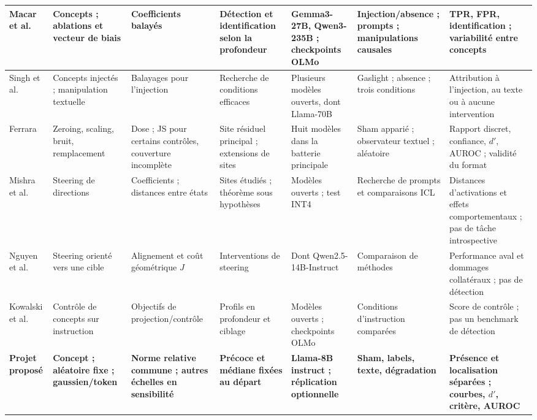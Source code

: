 \documentclass[10pt,a4paper]{article}
\begin{document}
\begin{landscape}
\begin{longtable}{@{}L{2.2cm}L{3.25cm}L{3.5cm}L{3.0cm}L{3.25cm}L{4.0cm}L{5.0cm}@{}}
Macar et al. & Concepts ; ablations et vecteur de biais & Coefficients balayés & Détection et identification selon la profondeur & Gemma3-27B, Qwen3-235B ; checkpoints OLMo & Injection/absence ; prompts ; manipulations causales & TPR, FPR, identification ; variabilité entre concepts\\\midrule
Singh et al. & Concepts injectés ; manipulation textuelle & Balayages pour l'injection & Recherche de conditions efficaces & Plusieurs modèles ouverts, dont Llama-70B & Gaslight ; absence ; trois conditions & Attribution à l'injection, au texte ou à aucune intervention\\\midrule
Ferrara & Zeroing, scaling, bruit, remplacement & Dose ; JS pour certains contrôles, couverture incomplète & Site résiduel principal ; extensions de sites & Huit modèles dans la batterie principale & Sham apparié ; observateur textuel ; aléatoire & Rapport discret, confiance, $d'$, AUROC ; validité du format\\\midrule
Mishra et al. & Steering de directions & Coefficients ; distances entre états & Sites étudiés ; théorème sous hypothèses & Modèles ouverts ; test INT4 & Recherche de prompts et comparaisons ICL & Distances d'activations et effets comportementaux ; pas de tâche introspective\\\midrule
Nguyen et al. & Steering orienté vers une cible & Alignement et coût géométrique $J$ & Interventions de steering & Dont Qwen2.5-14B-Instruct & Comparaison de méthodes & Performance aval et dommages collatéraux ; pas de détection\\\midrule
Kowalski et al. & Contrôle de concepts sur instruction & Objectifs de projection/contrôle & Profils en profondeur et ciblage & Modèles ouverts ; checkpoints OLMo & Conditions d'instruction comparées & Score de contrôle ; pas un benchmark de détection\\\midrule
\textbf{Projet proposé} & \textbf{Concept ; aléatoire fixe ; gaussien/token} & \textbf{Norme relative commune ; autres échelles en sensibilité} & \textbf{Précoce et médiane fixées au départ} & \textbf{Llama-8B instruct ; réplication optionnelle} & \textbf{Sham, labels, texte, dégradation} & \textbf{Présence et localisation séparées ; courbes, $d'$, critère, AUROC}\\
\end{longtable}
\end{landscape}\restoregeometry
\end{document}
